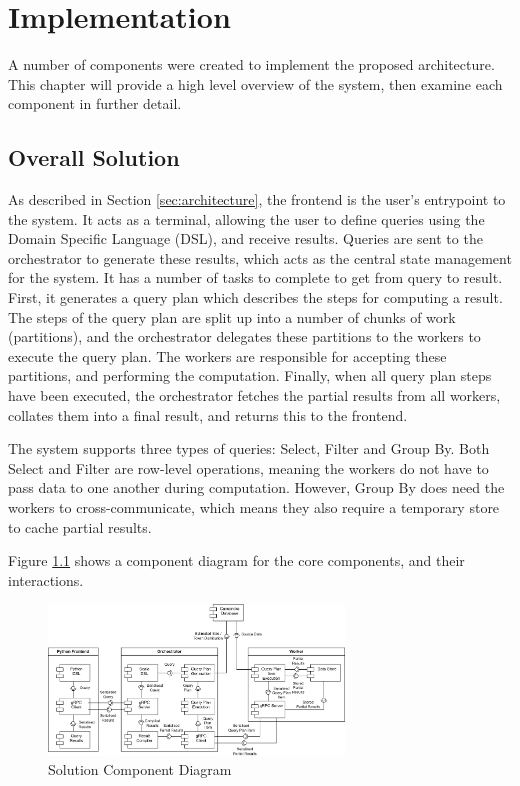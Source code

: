 \chapter{Implementation}

A number of components were created to implement the proposed architecture. This chapter will provide a high level overview of the system, then examine each component in further detail.

\section{Overall Solution}
As described in Section \ref{sec:architecture}, the frontend is the user's entrypoint to the system. It acts as a terminal, allowing the user to define queries using the Domain Specific Language (DSL), and receive results. Queries are sent to the orchestrator to generate these results, which acts as the central state management for the system. It has a number of tasks to complete to get from query to result. First, it generates a query plan which describes the steps for computing a result. The steps of the query plan are split up into a number of chunks of work (partitions), and the orchestrator delegates these partitions to the workers to execute the query plan. The workers are responsible for accepting these partitions, and performing the computation. Finally, when all query plan steps have been executed, the orchestrator fetches the partial results from all workers, collates them into a final result, and returns this to the frontend. 

The system supports three types of queries: Select, Filter and Group By. Both Select and Filter are row-level operations, meaning the workers do not have to pass data to one another during computation. However, Group By does need the workers to cross-communicate, which means they also require a temporary store to cache partial results.

Figure \ref{fig:component-architecture-diagram} shows a component diagram for the core components, and their interactions.

\begin{figure}[h]
	\centering
	\includegraphics[width=0.7\textwidth]{chapters/diagrams/implementation/component-architecture-diagram}
	\caption{Solution Component Diagram}
	\label{fig:component-architecture-diagram}
\end{figure}



